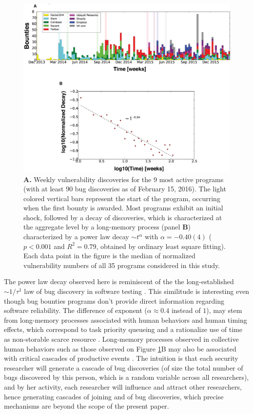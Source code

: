 \begin{figure}[h]
\begin{center}
\includegraphics[width=12cm]{../figures/timeline.eps}
\caption{\footnotesize {\bf A.} Weekly vulnerability discoveries for the 9 most active programs (with at least 90 bug discoveries as of February 15, 2016). The light colored vertical bars represent the start of the program, occurring when the first bounty is awarded. Most programs exhibit an initial shock, followed by a decay of discoveries, which is characterized at the aggregate level by a long-memory process (panel {\bf B}) characterized by a power law decay $\sim t^{\alpha}$ with $\alpha = -0.40(4)$ ($p < 0.001$ and $R^2 = 0.79$, obtained by ordinary least square fitting). Each data point in the figure is the median of normalized vulnerability numbers of all 35 programs considered in this study.}
\label{timeline}
\end{center}
\end{figure}

The power law decay observed here is reminiscent of the the long-established $\sim 1/\tau^{1}$ law of bug discovery in software testing \cite{adams1984textordfeminineoptimizing}. This similitude is interesting even though bug bounties programs don't provide direct information regarding software reliability. The difference of exponent ($\alpha \approx 0.4$ instead of $1$), may stem from long-memory processes associated with human behaviors and  human timing effects, which correspond to task priority queueing and a rationalize use of time as non-storable scarce resource \cite{maillart2011quantification}. Long-memory processes observed in collective human behaviors such as those observed on  Figure \ref{timeline}B may also be associated with critical cascades of productive events \cite{sornette2014much}. The intuition is that each security researcher will generate a cascade of bug discoveries (of size the total number of bugs discovered by this person, which is a random variable across all researchers), and by her activity, each researcher will influence and attract other researchers, hence generating cascades of joining and of bug discoveries, which precise mechanisms are beyond the scope of the present paper.

